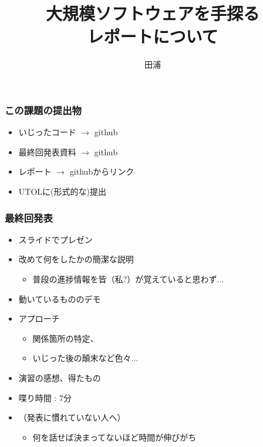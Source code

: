 \documentclass[12pt,dvipdfmx]{beamer}
\title{大規模ソフトウェアを手探る \\ レポートについて}
\institute{}
\author{田浦}
\date{}
\newcommand{\ao}[1]{{\color{blue}#1}}
\newcommand{\aka}[1]{{\color{red}#1}}
\begin{document}
\maketitle

\begin{frame}
\frametitle{この課題の提出物}
\begin{itemize}
\item いじったコード $\rightarrow$ github
\item 最終回発表資料 $\rightarrow$ github
\item \aka{レポート} $\rightarrow$ githubからリンク
\item UTOLに(形式的な)提出
\end{itemize}
\end{frame}

\begin{frame}
\frametitle{最終回発表}
\begin{itemize}
\item スライドでプレゼン
\item 改めて何をしたかの簡潔な説明
  \begin{itemize}
  \item 普段の進捗情報を皆（私?）が覚えていると思わず...
  \end{itemize}
\item 動いているもののデモ
\item アプローチ
  \begin{itemize}
  \item 関係箇所の特定、
  \item いじった後の顛末など色々...
  \end{itemize}
\item \ao{演習の感想、得たもの}
\item 喋り時間 : 7分
\item （発表に慣れていない人へ）
  \begin{itemize}
  \item 何を話せば決まってないほど時間が伸びがち
  \end{itemize}
\end{itemize}
\end{frame}
\end{document}
